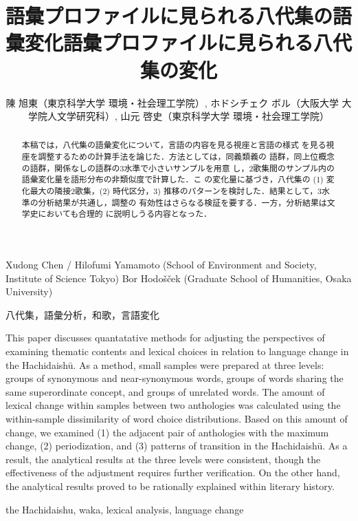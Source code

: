 \documentclass[submit]{ipsj}
\author{陳 旭東（東京科学大学 環境・社会理工学院）, ホドシチェク ボル（大阪大学 大学院人文学研究科）, 山元 啓史（東京科学大学 環境・社会理工学院）}
\date{}
\title{語彙プロファイルに見られる八代集の語彙変化}
\renewcommand{\author}[1]{}
\begin{document}
\title{語彙プロファイルに見られる八代集の変化}


\author{陳 旭東・山元 啓史（東京科学大学 環境・社会理工学院）}{Xudong Chen / Hilofumi Yamamoto (School of Environment and Society, Institute of Science Tokyo)}{}
\author{ホドシチェク ボル（大阪大学 大学院人文学研究科）}{Bor Hodo\v{s}\v{c}ek (Graduate School of Humanities, Osaka University)}{}

\begin{abstract}
  本稿では，八代集の語彙変化について，言語の内容を見る視座と言語の様式
  を見る視座を調整するための計算手法を論じた．方法としては，同義類義の
  語群，同上位概念の語群，関係なしの語群の3水準で小さいサンプルを用意
  し，2歌集間のサンプル内の語彙変化量を語形分布の非類似度で計算した．こ
  の変化量に基づき，八代集の (1) 変化最大の隣接2歌集，(2) 時代区分，3)
  推移のパターンを検討した．結果として，3水準の分析結果が共通し，調整の
  有効性はさらなる検証を要する．一方，分析結果は文学史においても合理的
  に説明しうる内容となった．
\end{abstract}

\begin{jkeyword}
  八代集，語彙分析，和歌，言語変化
\end{jkeyword}

\begin{eabstract}
  This paper discusses quantatative methods for adjusting the
  perspectives of examining thematic contents and lexical choices in
  relation to language change in the Hachidaishū. As a method, small
  samples were prepared at three levels: groups of synonymous and
  near-synonymous words, groups of words sharing the same
  superordinate concept, and groups of unrelated words. The amount of
  lexical change within samples between two anthologies was calculated
  using the within-sample dissimilarity of word choice
  distributions. Based on this amount of change, we examined (1) the
  adjacent pair of anthologies with the maximum change, (2)
  periodization, and (3) patterns of transition in the Hachidaishū. As
  a result, the analytical results at the three levels were
  consistent, though the effectiveness of the adjustment requires
  further verification. On the other hand, the analytical results
  proved to be rationally explained within literary history.
\end{eabstract}

\begin{ekeyword}
the Hachidaishu, waka, lexical analysis, language change
\end{ekeyword}
\end{document}
